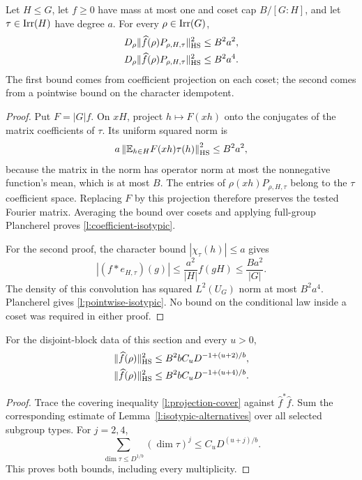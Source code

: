 \begin{lemma}\label{l:isotypic-alternatives}
Let $H\le G$, let $f\ge0$ have mass at most one and coset cap $B/[G:H]$, and let $\tau\in\operatorname{Irr}(H)$ have degree $a$. For every $\rho\in\operatorname{Irr}(G)$,
\begin{align}
 D_\rho\|\widehat f(\rho)P_{\rho,H,\tau}\|_{\mathrm{HS}}^2&\le B^2a^2,\label{l:coefficient-isotypic}\\
 D_\rho\|\widehat f(\rho)P_{\rho,H,\tau}\|_{\mathrm{HS}}^2&\le B^2a^4.\label{l:pointwise-isotypic}
\end{align}
The first bound comes from coefficient projection on each coset; the second comes from a pointwise bound on the character idempotent.
\end{lemma}
\begin{proof}
Put $F=|G|f$. On $xH$, project $h\mapsto F(xh)$ onto the conjugates of the matrix coefficients of $\tau$. Its uniform squared norm is
\[
 a\left\|\mathbb E_{h\in H}F(xh)\tau(h)\right\|_{\mathrm{HS}}^2\le B^2a^2,
\]
because the matrix in the norm has operator norm at most the nonnegative function's mean, which is at most $B$. The entries of $\rho(xh)P_{\rho,H,\tau}$ belong to the $\tau$ coefficient space. Replacing $F$ by this projection therefore preserves the tested Fourier matrix. Averaging the bound over cosets and applying full-group Plancherel proves \eqref{l:coefficient-isotypic}.

For the second proof, the character bound $|\chi_\tau(h)|\le a$ gives
\[
 |(f*e_{H,\tau})(g)|\le\frac{a^2}{|H|}f(gH)\le\frac{Ba^2}{|G|}.
\]
The density of this convolution has squared $L^2(U_G)$ norm at most $B^2a^4$. Plancherel gives \eqref{l:pointwise-isotypic}. No bound on the conditional law inside a coset was required in either proof.
\end{proof}

\begin{proposition}
\label{l:coefficient-lift}\label{l:coarse-character-lift}
For the disjoint-block data of this section and every $u>0$,
\begin{align}
 \|\widehat f(\rho)\|_{\mathrm{HS}}^2&\le B^2bC_uD^{-1+(u+2)/b},\label{l:coefficient-hs}\\
 \|\widehat f(\rho)\|_{\mathrm{HS}}^2&\le B^2bC_uD^{-1+(u+4)/b}.\label{l:coarse-hs}
\end{align}
\end{proposition}
\begin{proof}
Trace the covering inequality \eqref{l:projection-cover} against $\widehat f^*\widehat f$. Sum the corresponding estimate of Lemma~\ref{l:isotypic-alternatives} over all selected subgroup types. For $j=2,4$,
\[
 \sum_{\dim\tau\le D^{1/b}}(\dim\tau)^j
 \le C_uD^{(u+j)/b}.
\]
This proves both bounds, including every multiplicity.
\end{proof}

